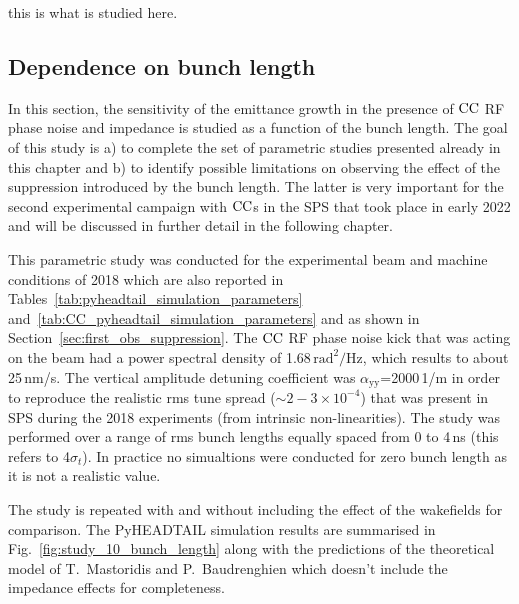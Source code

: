 this is what is studied here.


\subsection{Dependence on bunch length}

In this section, the sensitivity of the emittance growth in the presence of ${\mathrm{CC}}$ RF phase noise and impedance is studied as a function of the bunch length. The goal of this study is a) to complete the set of parametric studies presented already in this chapter and b) to identify possible limitations on observing the effect of the suppression introduced by the bunch length. The latter is very important for the second experimental campaign with ${\mathrm{CC}}$s in the SPS that took place in early 2022 and will be discussed in further detail in the following chapter.

This parametric study was conducted for the experimental beam and machine conditions of 2018 which are also reported in Tables~\ref{tab:pyheadtail_simulation_parameters} and~\ref{tab:CC_pyheadtail_simulation_parameters} and as shown in Section~\ref{sec:first_obs_suppression}. The ${\mathrm{CC}}$ RF phase noise kick that was acting on the beam had a power spectral density of 1.68\,$\mathrm{rad^2/Hz}$, which results to about 25\,nm/s. The vertical amplitude detuning coefficient was  $\alpha_\mathrm{yy}$=2000\,1/m in order to reproduce the realistic rms tune spread ($\sim 2-3 \times 10^{-4}$) that was present in SPS during the 2018 experiments (from intrinsic non-linearities). The study was performed over a range of rms bunch lengths equally spaced from 0 to 4\,ns (this refers to 4$\sigma_t$). In practice no simualtions were conducted for zero bunch length as it is not a realistic value.


The study is repeated with and without including the effect of the wakefields for comparison. The PyHEADTAIL simulation results are summarised in Fig.~\ref{fig:study_10_bunch_length} along with the predictions of the theoretical model of T.~Mastoridis and P.~Baudrenghien which doesn't include the impedance effects for completeness.

